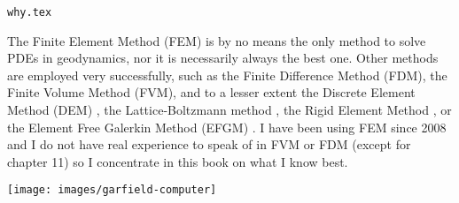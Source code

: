 \begin{flushright} {\tiny {\color{gray} \tt why.tex}} \end{flushright}

The Finite Element Method (FEM) is by no means the only method 
to solve PDEs in geodynamics, nor it is necessarily always the best one.
Other methods are employed very successfully, such as the Finite Difference 
Method (FDM), the Finite Volume Method (FVM), and to a lesser extent
the Discrete Element Method (DEM) \cite{tasy05,egho07,egsc07,funi14,jitd23}, 
the Lattice-Boltzmann method \cite{hupc08}, the Rigid Element Method \cite{lacj15},  
or the Element Free Galerkin Method (EFGM) \cite{hans03}.
I have been using FEM since 2008 and I do not have real 
experience to speak of in FVM or FDM (except for chapter 11)
so I concentrate in this book 
on what I know best. 

\begin{center}
\texttt{[image: images/garfield-computer]}
\end{center}

